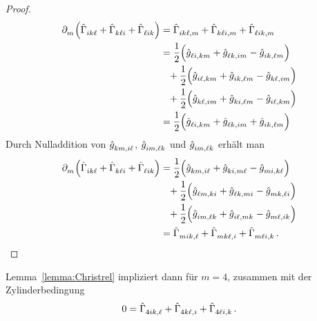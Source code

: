 \begin{proof}
\begin{equation*}
\begin{split}
\pdif{_m}\left(\tensor*{\hat{\Gamma}}{_i_k_\ell}+\tensor*{\hat{\Gamma}}{_k_\ell_i}+\tensor*{\hat{\Gamma}}{_\ell_i_k}\right)
&=\tensor*{\hat{\Gamma}}{_i_k_\ell_{,m}}+\tensor*{\hat{\Gamma}}{_k_\ell_i_{,m}}+\tensor*{\hat{\Gamma}}{_\ell_i_k_{,m}}\\
&=\frac{1}{2}
\left( \tensor{\hat{g}}{_\ell_i_{,km}} + \tensor{\hat{g}}{_\ell_k_{,im}}
-\tensor{\hat{g}}{_i_k_{,\ell m}}\right)\\
&\phantom{=}+\frac{1}{2}\left( \tensor{\hat{g}}{_i_\ell_{,km}} +
\tensor{\hat{g}}{_i_k_{,\ell m}} -\tensor{\hat{g}}{_k_\ell_{,im}}\right)\\
&\phantom{=}+\frac{1}{2}\left( \tensor{\hat{g}}{_k_\ell_{,im}} +
\tensor{\hat{g}}{_k_i_{,\ell m}} -\tensor{\hat{g}}{_i_\ell_{,km}}\right)\\
&=\frac{1}{2}
\left( \tensor{\hat{g}}{_\ell_i_{,km}} + \tensor{\hat{g}}{_\ell_k_{,im}}
+\tensor{\hat{g}}{_i_k_{,\ell m}}\right)\\
\end{split}
\end{equation*}
Durch Nulladdition von $\tensor{\hat{g}}{_k_m_{,i\ell}}$, $
\tensor{\hat{g}}{_i_m_{,\ell k}}$ und
$\tensor{\hat{g}}{_i_m_{,\ell k}}$ erhält man
\begin{equation}
\begin{split}
\pdif{_m}\left(\tensor*{\hat{\Gamma}}{_i_k_\ell}+\tensor*{\hat{\Gamma}}{_k_\ell_i}+\tensor*{\hat{\Gamma}}{_\ell_i_k}\right)
&=\frac{1}{2}
\left( \tensor{\hat{g}}{_k_m_{,i\ell}} + \tensor{\hat{g}}{_k_i_{,m\ell}}
-\tensor{\hat{g}}{_m_i_{,k\ell}}\right)\\
&\phantom{=}+\frac{1}{2}\left( \tensor{\hat{g}}{_\ell_m_{,ki}} +
\tensor{\hat{g}}{_\ell_k_{,mi}} -\tensor{\hat{g}}{_m_k_{,\ell i}}\right)\\
&\phantom{=}+\frac{1}{2}\left( \tensor{\hat{g}}{_i_m_{,\ell k}} +
\tensor{\hat{g}}{_i_\ell_{,mk}} -\tensor{\hat{g}}{_m_\ell_{,ik}}\right)\\
&=\tensor*{\hat{\Gamma}}{_m_i_k_{,\ell}}+\tensor*{\hat{\Gamma}}{_m_k_\ell_{,i}}+\tensor*{\hat{\Gamma}}{_m_\ell_i_{,k}}
\,. \qedhere
\end{split}
\end{equation}
\end{proof}
Lemma~\ref{lemma:Christrel} impliziert dann für $m=4$, zusammen mit der
Zylinderbedingung
\begin{equation}
0=\tensor*{\hat{\Gamma}}{_4_i_k_{,\ell}}+\tensor*{\hat{\Gamma}}{_4_k_\ell_{,i}}+\tensor*{\hat{\Gamma}}{_4_\ell_i_{,k}}\,.
\label{eq:fdchristrel}
\end{equation}
